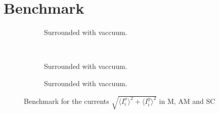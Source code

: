 \documentclass[../main.tex]{subfiles}
\begin{document}
\section{Benchmark}
\begin{figure}[H]
    \centering
    \begin{subfigure}{0.3\textwidth}
        \centering
        
        \caption{Surrounded with vaccuum.}
        \label{fig:first}
    \end{subfigure}\\
    \begin{subfigure}{0.45\textwidth}
        \centering
        
        \caption{Surrounded with vaccuum.}
        \label{fig:first}
    \end{subfigure}
    \hspace{0.1\textwidth}
    \begin{subfigure}{0.45\textwidth}
        \centering
        
        \caption{Surrounded with vaccuum.}
        \label{fig:first}
    \end{subfigure}
    \caption{Benchmark for the currents $\sqrt{\langle I^x_i\rangle^2 + \langle I^y_i\rangle^2}$ in M, AM and SC}
\end{figure}
\end{document}
